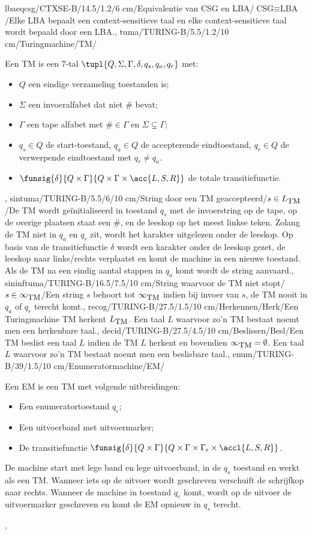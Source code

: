 lbaeqcsg/CTXSE-B/14.5/1.2/6 cm/Equivalentie van CSG en LBA/$\mbox{CSG}\equiv\mbox{LBA}$/{Elke LBA bepaalt een context-sensitieve taal en elke context-sensitieve taal wordt bepaald door een LBA.},
tuma/TURING-B/5.5/1.2/10 cm/Turingmachine/TM/{Een TM is een $7$-tal $\tupl{Q,\Sigma,\Gamma,\delta,q_s,q_a,q_r}$ met:\begin{itemize}\item $Q$ een eindige verzameling toestanden is;\item $\Sigma$ een invoeralfabet dat niet $\#$ bevat;\item $\Gamma$ een tape alfabet met $\#\in\Gamma$ en $\Sigma\subsetneq\Gamma$;\item $q_s\in Q$ de start-toestand, $q_a\in Q$ de accepterende eindtoestand, $q_r\in Q$ de verwerpende eindtoestand met $q_r\neq q_a$.\item $\funsig{\delta}{Q\times\Gamma}{Q\times\Gamma\times\acc{L,S,R}}$ de totale transitiefunctie.\end{itemize}},
sintuma/TURING-B/5.5/6/10 cm/String door een TM geaccepteerd/$s\in L_{\mbox{\small TM}}$/{De TM wordt ge\"initialiseerd in toestand $q_s$ met de invoerstring op de tape, op de overige plaatsen staat een $\#$, en de leeskop op het meest linkse teken. Zolang de TM niet in $q_a$ en $q_r$ zit, wordt het karakter uitgelezen onder de leeskop. Op basis van de transitiefunctie $\delta$ wordt een karakter onder de leeskop gezet, de leeskop naar links/rechts verplaatst en komt de machine in een nieuwe toestand. Als de TM na een eindig aantal stappen in $q_a$ komt wordt de string aanvaard.},
sininftuma/TURING-B/16.5/7.5/10 cm/String waarvoor de TM niet stopt/$s\in\infty_{\mbox{\small TM}}$/{Een string $s$ behoort tot $\infty_{\mbox{\small TM}}$ indien bij invoer van $s$, de TM nooit in $q_a$ of $q_r$ terecht komt.},
recog/TURING-B/27.5/1.5/10 cm/Herkennen/Herk/{Een Turingmachine TM herkent $L_{\mbox{\small TM}}$. Een taal $L$ waarvoor zo'n TM bestaat noemt men een herkenbare taal.},
decid/TURING-B/27.5/4.5/10 cm/Beslissen/Besl/{Een TM beslist een taal $L$ indien de TM $L$ herkent en bovendien $\infty_{\mbox{\small TM}}=\emptyset$. Een taal $L$ waarvoor zo'n TM bestaat noemt men een beslisbare taal.},
enum/TURING-B/39/1.5/10 cm/Enumeratormachine/EM/{Een EM is een TM met volgende uitbreidingen:\begin{itemize}\item Een enumeratortoestand $q_e$;\item Een uitvoerband met uitvoermarker;\item De transitiefunctie $\funsig{\delta}{Q\times\Gamma}{Q\times\Gamma\times\Gamma_{\epsilon}\times\accl{L,S,R}}$.\end{itemize}De machine start met lege band en lege uitvoerband, in de $q_s$ toestand en werkt als een TM. Wanneer iets op de uitvoer wordt geschreven verschuift de schrijfkop naar rechts. Wanneer de machine in toestand $q_e$ komt, wordt op de uitvoer de uitvoermarker geschreven en komt de EM opnieuw in $q_s$ terecht.},
